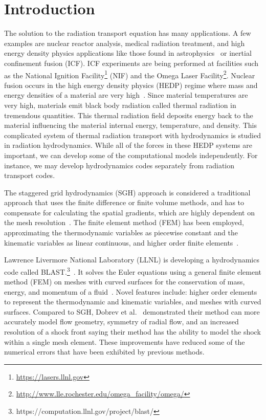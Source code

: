 \documentclass{article}
\begin{document}
\section{Introduction}
The solution to the radiation transport equation has many applications. A few examples are nuclear reactor analysis, medical radiation treatment, and high energy density physics applications like those found in astrophysics~\cite{Castor_Rad_Hydro} or inertial confinement fusion (ICF). ICF experiments are being performed at facilities such as the National Ignition Facility\footnote{\url{https://lasers.llnl.gov}} (NIF) and the Omega Laser Facility\footnote{\url{http://www.lle.rochester.edu/omega_facility/omega/}}. Nuclear fusion occurs in the high energy density physics (HEDP) regime where mass and energy densities of a material are very high~\cite{DrakeHEDPPaper, Castor_Rad_Hydro}. Since material temperatures are very high, materials emit black body radiation called thermal radiation in tremendous quantities. This thermal radiation field deposits energy back to the material influencing the material internal energy, temperature, and density. This complicated system of thermal radiation transport with hydrodynamics is studied in radiation hydrodynamics. While all of the forces in these HEDP systems are important, we can develop some of the computational models independently. For instance, we may develop hydrodynamics codes separately from radiation transport codes.

{\color{blue}
The staggered grid hydrodynamics (SGH) approach is considered a traditional approach that uses the finite difference or finite volume methods, and has to compensate for calculating the spatial gradients, which are highly dependent on the mesh resolution~\cite{DobrevHOFEMHydro}. The finite element method (FEM) has been employed, approximating the thermodynamic variables as piecewise constant and the kinematic variables as linear continuous\cite{ScovazziQ1P0Hydro}, and higher order finite elements~\cite{DobrevCurvilinearFEMHydro}.
}

Lawrence Livermore National Laboratory (LLNL) is developing a hydrodynamics code called BLAST.\footnote{https://computation.llnl.gov/project/blast/}~\cite{DobrevHOFEMHydro}. It solves the Euler equations using a general finite element method (FEM) on meshes with curved surfaces for the conservation of mass, energy, and momentum of a fluid~\cite{DobrevCurvilinearFEMHydro}. Novel features include: higher order elements to represent the thermodynamic and kinematic variables, and meshes with curved surfaces. Compared to SGH, Dobrev et al.~\cite{DobrevCurvilinearFEMHydro} demonstrated their method can more accurately model flow geometry, symmetry of radial flow, and an increased resolution of a shock front saying their method has the ability to model the shock within a single mesh element. These improvements have reduced some of the numerical errors that have been exhibited by previous methods.
\end{document}
